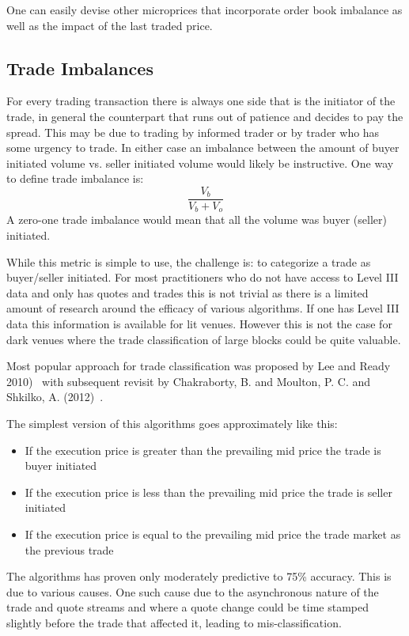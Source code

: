 One can easily devise other microprices that incorporate order book imbalance as well as the impact of the last traded price.

\subsection{Trade Imbalances}

For every trading transaction there is always one side that is the initiator of the trade, in general the counterpart that runs out of patience and decides to pay the spread. This may be due to trading by informed trader or by trader who has some urgency to trade. In either case an imbalance between the amount of buyer initiated volume vs. seller initiated volume would likely be instructive. One way to define trade imbalance is: 
	\begin{equation}\label{eq:vbs}
		\frac{V_b}{V_b+V_o}	
	\end{equation} 
A zero-one trade imbalance would mean that all the volume was buyer (seller) initiated. 


While this metric is simple to use, the challenge is: to categorize a trade as buyer/seller initiated. For most practitioners who do not have access to Level III data and only has quotes and trades this is not trivial as there is a limited amount of research around the efficacy of various algorithms. If one has Level III data this information is available for lit venues. However this is not the case for dark venues where the trade classification of large blocks could be quite valuable.


Most popular approach for trade classification was proposed by Lee and Ready 2010)~\cite{leeready} with subsequent revisit by Chakraborty, B. and Moulton, P. C. and Shkilko, A. (2012)~\cite{chakrabarty2012short}.


The simplest version of this algorithms goes approximately like this:
\begin{itemize}
\item If the execution price is greater than the prevailing mid price the trade is buyer initiated
\item If the execution price is less than the prevailing mid price the trade is seller initiated
\item If the execution price is equal to the prevailing mid price the trade market as the previous trade
\end{itemize}

The algorithms has proven only moderately predictive to  75\% accuracy. This is due to various causes. One such cause due to the asynchronous nature of the trade and quote streams and where a quote change could be time stamped slightly before the trade that affected it, leading to mis-classification.


